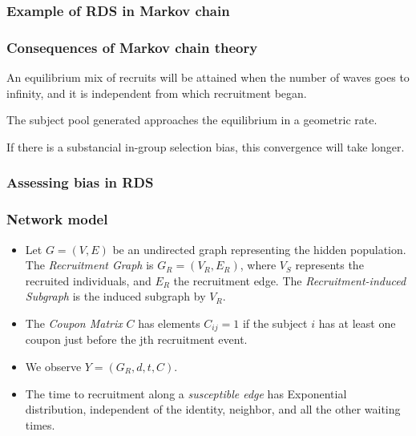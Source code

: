 \documentclass{beamer}
\begin{document}
\begin{frame}
  \frametitle{Example of RDS in Markov chain}
\end{frame}

\begin{frame}
  \frametitle{Consequences of Markov chain theory}

  \begin{theorem}
    \justifying
    An equilibrium mix of recruits will be attained when the number of waves
    goes to infinity, and it is independent from which recruitment began. 
  \end{theorem}

  \begin{theorem}
    The subject pool generated approaches the equilibrium in a geometric rate.
  \end{theorem}

  \begin{theorem}[Remark]
    If there is a substancial in-group selection bias, this convergence will
    take longer. 
  \end{theorem}
\end{frame}

\begin{frame}
  \frametitle{Assessing bias in RDS}
\end{frame}

\begin{frame}
\frametitle{Network model}  

\begin{itemize}
  \justifying
  \item Let $G = (V, E)$ be an undirected graph representing the hidden
  population. The {\em Recruitment Graph} is $G_R = (V_R, E_R)$,
  where $V_S$ represents the recruited individuals, and $E_R$ the recruitment
  edge. The {\em Recruitment-induced Subgraph} is the induced subgraph by
  $V_R$. 

  \item The {\em Coupon Matrix} $C$ has elements $C_{ij} = 1$ if the subject
  $i$ has at least one coupon just before the jth recruitment event. 

  \item We observe $Y = (G_R, d, t, C)$. 
  
  \item The time to recruitment along a {\em susceptible edge} has Exponential
  distribution, independent of the identity, neighbor, and all the other
  waiting times.

\end{itemize}

\end{frame}
\end{document}
